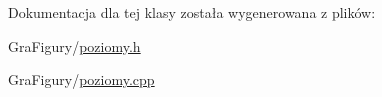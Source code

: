 Dokumentacja dla tej klasy została wygenerowana z plików\-:\begin{DoxyCompactItemize}
\item 
Gra\-Figury/\hyperlink{GraFigury_2poziomy_8h}{poziomy.\-h}\item 
Gra\-Figury/\hyperlink{GraFigury_2poziomy_8cpp}{poziomy.\-cpp}\end{DoxyCompactItemize}
